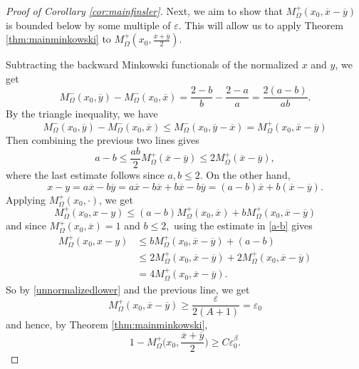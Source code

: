 \documentclass[10pt,a4paper]{amsart}
\begin{document}
\begin{proof}[Proof of Corollary \ref{cor:mainfinsler}]
Next, we aim to show that $M^+_\Omega(x_0, \overline{x}-\overline{y})$ is bounded below by some multiple of $\varepsilon$. This will allow us to apply Theorem \ref{thm:mainminkowski} to $M^+_\Omega(x_0,\frac{\overline{x}+\overline{y}}{2})$.

Subtracting the backward Minkowski functionals of the normalized $x$ and $y$, we get
\begin{equation}
 M^-_\Omega(x_0, \overline{y})-M^-_\Omega(x_0, \overline{x})= \frac{2-b}{b} - \frac{2-a}{a} = \frac{2(a-b)}{ab}.  
\end{equation}
By the triangle inequality, we have
\begin{equation}
 M^-_\Omega(x_0, \overline{y})-M^-_\Omega(x_0, \overline{x}) \leq M^-_\Omega(x_0, \overline{y}-\overline{x}) = M^+_\Omega(x_0, \overline{x}-\overline{y})
\end{equation}
Then combining the previous two lines gives
\begin{equation}\label{a-b}
    a-b \leq \frac{ab}{2} M^+_\Omega(\overline{x}-\overline{y}) \leq 2 M^+_\Omega(\overline{x}-\overline{y}),
\end{equation}
where the last estimate follows since $a,b \leq 2.$
On the other hand,
\begin{equation}
    x-y = a\overline{x} - b\overline{y} = a\overline{x}-b\overline{x}+b\overline{x}-b\overline{y} = (a-b)\overline{x}+b(\overline{x}-\overline{y}).
\end{equation}
Applying $M^+_\Omega(x_0,\cdot)$, we get
\begin{equation}
    M^+_\Omega(x_0,x-y) \leq (a-b)M^+_\Omega(x_0,\overline{x}) + bM^+_\Omega(x_0,\overline{x}-\overline{y})
\end{equation}
and since $M^+_\Omega(x_0,\overline{x})=1$ and $b \leq 2,$ using the estimate in \ref{a-b} gives
\begin{align}
 M^+_\Omega(x_0,x-y) & \leq bM^+_\Omega(x_0,\overline{x}-\overline{y}) + (a-b)\\
 & \leq 2M^+_\Omega(x_0,\overline{x}-\overline{y}) + 2M^+_\Omega(x_0,\overline{x}-\overline{y})\\
 & = 4M^+_\Omega(x_0,\overline{x}-\overline{y}).
 \end{align}
So by \ref{unnormalizedlower} and the previous line, we get
\begin{equation}
    M^+_\Omega(x_0,\overline{x}-\overline{y}) \geq \frac{\varepsilon}{2(A+1)}=\varepsilon_0
\end{equation}
and hence, by Theorem \ref{thm:mainminkowski},
\begin{equation}
    1-M^+_\Omega\bigg(x_0,\frac{\overline{x}+\overline{y}}{2}\bigg) \geq C\varepsilon_0^\beta.
\end{equation}


\end{proof}
\end{document}
